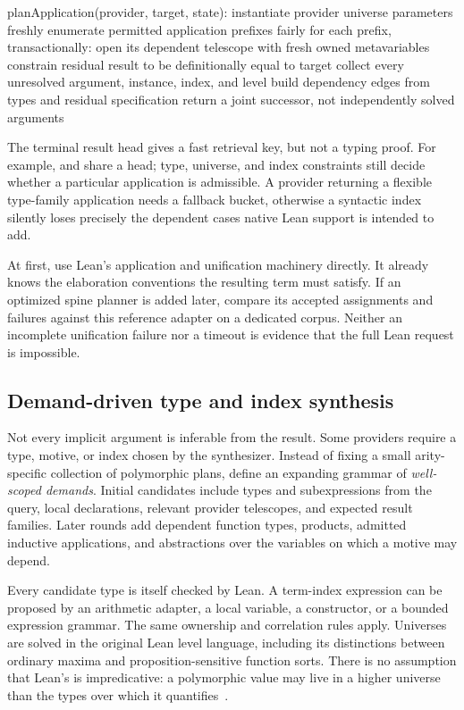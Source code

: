 \documentclass[11pt,letterpaper]{article}
\newcommand{\id}[1]{\texttt{\detokenize{#1}}}
\theoremstyle{definition}
\theoremstyle{remark}
\begin{document}
\begin{code}
planApplication(provider, target, state):
    instantiate provider universe parameters freshly
    enumerate permitted application prefixes fairly
    for each prefix, transactionally:
        open its dependent telescope with fresh owned metavariables
        constrain residual result to be definitionally equal to target
        collect every unresolved argument, instance, index, and level
        build dependency edges from types and residual specification
        return a joint successor, not independently solved arguments
\end{code}

The terminal result head gives a fast retrieval key, but not a typing proof. For example, \id{Vec A n} and \id{Vec B m} share a head; type, universe, and index constraints still decide whether a particular application is admissible. A provider returning a flexible type-family application needs a fallback bucket, otherwise a syntactic index silently loses precisely the dependent cases native Lean support is intended to add.

At first, use Lean's application and unification machinery directly. It already knows the elaboration conventions the resulting term must satisfy. If an optimized spine planner is added later, compare its accepted assignments and failures against this reference adapter on a dedicated corpus. Neither an incomplete unification failure nor a timeout is evidence that the full Lean request is impossible.

\subsection{Demand-driven type and index synthesis}

Not every implicit argument is inferable from the result. Some providers require a type, motive, or index chosen by the synthesizer. Instead of fixing a small arity-specific collection of polymorphic plans, define an expanding grammar of \emph{well-scoped demands}. Initial candidates include types and subexpressions from the query, local declarations, relevant provider telescopes, and expected result families. Later rounds add dependent function types, products, admitted inductive applications, and abstractions over the variables on which a motive may depend.

Every candidate type is itself checked by Lean. A term-index expression can be proposed by an arithmetic adapter, a local variable, a constructor, or a bounded expression grammar. The same ownership and correlation rules apply. Universes are solved in the original Lean level language, including its distinctions between ordinary maxima and proposition-sensitive function sorts. There is no assumption that Lean's \id{Type} is impredicative: a polymorphic value may live in a higher universe than the types over which it quantifies~\cite{types}.
\end{document}
